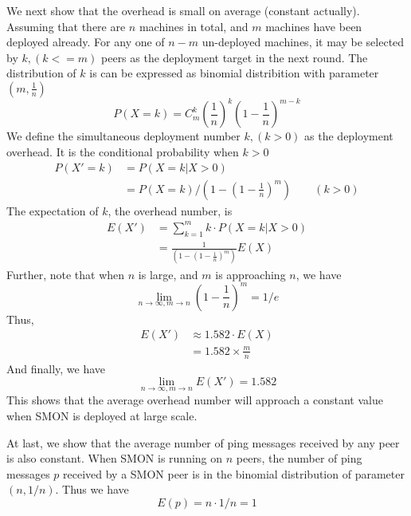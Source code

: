 We next show that the overhead is small on average (constant
actually). Assuming that there are $n$ machines in total,
and $m$ machines have been deployed already. For any one of
$n-m$ un-deployed machines, it may be selected by $k, (k <=
m)$ peers as the deployment target in the next round.  The
distribution of $k$ is can be expressed as binomial
distribition with parameter $(m, \frac{1}{n})$
\begin{equation*}
P(X=k) = C_m^k (\frac{1}{n})^k (1 - \frac{1}{n})^{m - k}
\end{equation*}
We define the simultaneous deployment number $k, (k > 0)$ as
the deployment overhead. It is the conditional probability
when $k > 0$
\begin{equation*}
\begin{aligned}
P(X' = k) &= P(X=k | X > 0) \\
&= P(X = k) / (1 - (1 - \frac{1}{n})^{m}) \qquad (k > 0)
\end{aligned}
\end{equation*}
The expectation of $k$, the overhead number, is
\begin{equation*}
\begin{aligned}
E(X') &= \sum_{k=1}^m k \cdot P(X=k|X>0)  \\
      &= \frac{1}{(1 - (1 - \frac{1}{n})^{m})} E(X)
\end{aligned}
\end{equation*}
Further, note that when $n$ is large, and $m$ is approaching
$n$, we have
\begin{equation*}
\lim_{n \to \infty, m \to n} (1 - \frac{1}{n})^{m} = 1 / e
\end{equation*}
Thus,
\begin{equation*}
\begin{aligned}
E(X') &\approx 1.582 \cdot E(X) \\
      &= 1.582 \times \frac{m}{n}
\end{aligned}
\end{equation*}
And finally, we have
\begin{equation*}
\lim_{n \to \infty, m \to n} E(X') = 1.582
\end{equation*}
This shows that the average overhead number will approach a
constant value when SMON is deployed at large scale.

At last, we show that the average number of ping messages
received by any peer is also constant.  When SMON is running
on $n$ peers, the number of ping messages $p$ received by a
SMON peer is in the binomial distribution of parameter $(n,
1/n)$. Thus we have
\begin{equation*}
E(p) = n \cdot 1/n = 1
\end{equation*}






